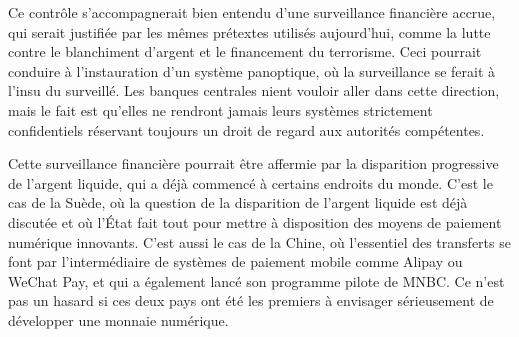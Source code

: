Ce contrôle s'accompagnerait bien entendu d'une surveillance financière accrue, qui serait justifiée par les mêmes prétextes utilisés aujourd'hui, comme la lutte contre le blanchiment d'argent et le financement du terrorisme. Ceci pourrait conduire à l'instauration d'un système panoptique, où la surveillance se ferait à l'insu du surveillé. Les banques centrales nient vouloir aller dans cette direction, mais le fait est qu'elles ne rendront jamais leurs systèmes strictement confidentiels réservant toujours un droit de regard aux autorités compétentes. %

Cette surveillance financière pourrait être affermie par la disparition progressive de l'argent liquide, qui a déjà commencé à certains endroits du monde. C'est le cas de la Suède, où la question de la disparition de l'argent liquide est déjà discutée et où l'État fait tout pour mettre à disposition des moyens de paiement numérique innovants. C'est aussi le cas de la Chine, où l'essentiel des transferts se font par l'intermédiaire de systèmes de paiement mobile comme Alipay ou WeChat Pay, et qui a également lancé son programme pilote de MNBC. Ce n'est pas un hasard si ces deux pays ont été les premiers à envisager sérieusement de développer une monnaie numérique.

